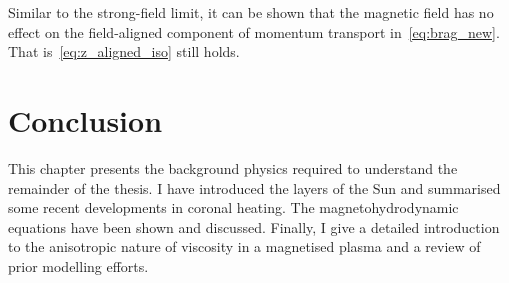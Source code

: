 Similar to the strong-field limit, it can be shown that the magnetic field has no effect on the field-aligned component of momentum transport in~\ref{eq:brag_new}. That is~\ref{eq:z_aligned_iso} still holds.

\section{Conclusion}

This chapter presents the background physics required to understand the remainder of the thesis. I have introduced the layers of the Sun and summarised some recent developments in coronal heating. The magnetohydrodynamic equations have been shown and discussed. Finally, I give a detailed introduction to the anisotropic nature of viscosity in a magnetised plasma and a review of prior modelling efforts.
